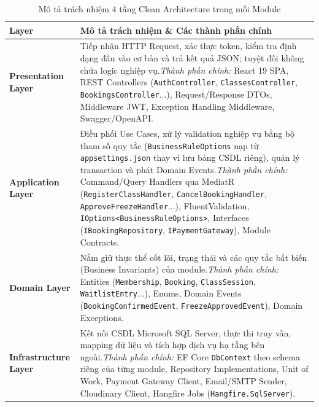 \documentclass[a4paper,12pt]{article}
\begin{document}
\begin{table}[H]
\centering
\begin{tabularx}{\textwidth}{|L{4.2cm}|Y|}
\hline
\textbf{Layer} & \textbf{Mô tả trách nhiệm \& Các thành phần chính} \\ \hline
\textbf{Presentation Layer} & Tiếp nhận HTTP Request, xác thực token, kiểm tra định dạng đầu vào cơ bản và trả kết quả JSON; tuyệt đối không chứa logic nghiệp vụ.\newline \textit{Thành phần chính:} React 19 SPA, REST Controllers (\texttt{AuthController}, \texttt{ClassesController}, \texttt{BookingsController}...), Request/Response DTOs, Middleware JWT, Exception Handling Middleware, Swagger/OpenAPI. \\ \hline
\textbf{Application Layer} & Điều phối Use Cases, xử lý validation nghiệp vụ bằng bộ tham số quy tắc (\texttt{BusinessRuleOptions} nạp từ \texttt{appsettings.json} thay vì lưu bảng CSDL riêng), quản lý transaction và phát Domain Events.\newline \textit{Thành phần chính:} Command/Query Handlers qua MediatR (\texttt{RegisterClassHandler}, \texttt{CancelBookingHandler}, \texttt{ApproveFreezeHandler}...), FluentValidation, \texttt{IOptions<BusinessRuleOptions>}, Interfaces (\texttt{IBookingRepository}, \texttt{IPaymentGateway}), Module Contracts. \\ \hline
\textbf{Domain Layer} & Nắm giữ thực thể cốt lõi, trạng thái và các quy tắc bất biến (Business Invariants) của module.\newline \textit{Thành phần chính:} Entities (\texttt{Membership}, \texttt{Booking}, \texttt{ClassSession}, \texttt{WaitlistEntry}...), Enums, Domain Events (\texttt{BookingConfirmedEvent}, \texttt{FreezeApprovedEvent}), Domain Exceptions. \\ \hline
\textbf{Infrastructure Layer} & Kết nối CSDL Microsoft SQL Server, thực thi truy vấn, mapping dữ liệu và tích hợp dịch vụ hạ tầng bên ngoài.\newline \textit{Thành phần chính:} EF Core \texttt{DbContext} theo schema riêng của từng module, Repository Implementations, Unit of Work, Payment Gateway Client, Email/SMTP Sender, Cloudinary Client, Hangfire Jobs (\texttt{Hangfire.SqlServer}). \\ \hline
\end{tabularx}
\caption{Mô tả trách nhiệm 4 tầng Clean Architecture trong mỗi Module}
\end{table}
\end{document}
